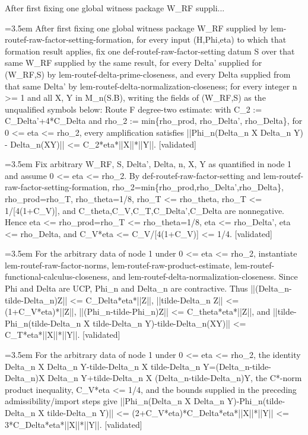 \documentclass{article}
\newcommand{\step}[1]{\par\noindent\hangindent=3.5em\hangafter=1%
  \makebox[3.5em][l]{\textbf{#1.}}}
\newcommand{\steptag}[1]{\hfill{\small\textsf{[#1]}}}
\begin{document}
\begin{proofbox}{After first fixing one global witness package W\_RF suppli...}
\step{1} After first fixing one global witness package W\_RF supplied by lem-routef-raw-factor-setting-formation, for every input (H,Phi,eta) to which that formation result applies, fix one def-routef-raw-factor-setting datum S over that same W\_RF supplied by the same result, for every Delta' supplied for (W\_RF,S) by lem-routef-delta-prime-closeness, and every Delta supplied from that same Delta' by lem-routef-delta-normalization-closeness; for every integer n >= 1 and all X, Y in M\_n(S.B), writing the fields of (W\_RF,S) as the unqualified symbols below: Route F degree-two estimate: with C\_2 := C\_Delta'+4*C\_Delta and rho\_2 := min\{rho\_prod, rho\_Delta', rho\_Delta\}, for 0 <= eta <= rho\_2, every amplification satisfies ||Phi\_n(Delta\_n X Delta\_n Y) - Delta\_n(XY)|| <= C\_2*eta*||X||*||Y||. \steptag{validated} \\[6pt]
\step{1.1} Fix arbitrary W\_RF, S, Delta', Delta, n, X, Y as quantified in node 1 and assume 0 <= eta <= rho\_2. By def-routef-raw-factor-setting and lem-routef-raw-factor-setting-formation, rho\_2=min\{rho\_prod,rho\_Delta',rho\_Delta\}, rho\_prod=rho\_T, rho\_theta=1/8, rho\_T <= rho\_theta, rho\_T <= 1/[4(1+C\_V)], and C\_theta,C\_V,C\_T,C\_Delta',C\_Delta are nonnegative. Hence eta <= rho\_prod=rho\_T <= rho\_theta=1/8, eta <= rho\_Delta', eta <= rho\_Delta, and C\_V*eta <= C\_V/[4(1+C\_V)] <= 1/4. \steptag{validated} \\[4pt]
\step{1.2} For the arbitrary data of node 1 under 0 <= eta <= rho\_2, instantiate lem-routef-raw-factor-norms, lem-routef-raw-product-estimate, lem-routef-functional-calculus-closeness, and lem-routef-delta-normalization-closeness. Since Phi and Delta are UCP, Phi\_n and Delta\_n are contractive. Thus ||(Delta\_n-tilde-Delta\_n)Z|| <= C\_Delta*eta*||Z||, ||tilde-Delta\_n Z|| <= (1+C\_V*eta)*||Z||, ||(Phi\_n-tilde-Phi\_n)Z|| <= C\_theta*eta*||Z||, and ||tilde-Phi\_n(tilde-Delta\_n X tilde-Delta\_n Y)-tilde-Delta\_n(XY)|| <= C\_T*eta*||X||*||Y||. \steptag{validated} \\[4pt]
\step{1.3} For the arbitrary data of node 1 under 0 <= eta <= rho\_2, the identity Delta\_n X Delta\_n Y-tilde-Delta\_n X tilde-Delta\_n Y=(Delta\_n-tilde-Delta\_n)X Delta\_n Y+tilde-Delta\_n X (Delta\_n-tilde-Delta\_n)Y, the C*-norm product inequality, C\_V*eta <= 1/4, and the bounds supplied in the preceding admissibility/import steps give ||Phi\_n(Delta\_n X Delta\_n Y)-Phi\_n(tilde-Delta\_n X tilde-Delta\_n Y)|| <= (2+C\_V*eta)*C\_Delta*eta*||X||*||Y|| <= 3*C\_Delta*eta*||X||*||Y||. \steptag{validated} \\[4pt]

\end{proofbox}
\end{document}
